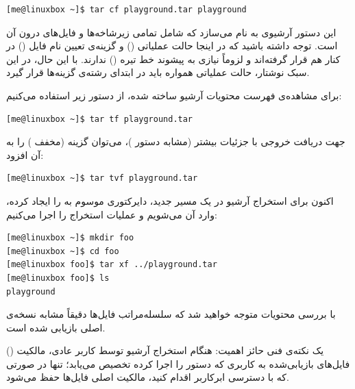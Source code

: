 \begin{latin}
\begin{lstlisting}
[me@linuxbox ~]$ tar cf playground.tar playground
\end{lstlisting}
\end{latin}

این دستور آرشیوی به نام  می‌سازد که شامل تمامی زیرشاخه‌ها و فایل‌های درون آن است. توجه داشته باشید که در اینجا حالت عملیاتی () و گزینه‌ی تعیین نام فایل () در کنار هم قرار گرفته‌اند و لزوماً نیازی به پیشوند خط تیره () ندارند. با این حال، در این سبک نوشتار، حالت عملیاتی همواره باید در ابتدای رشته‌ی گزینه‌ها قرار گیرد.

برای مشاهده‌ی فهرست محتویات آرشیو ساخته شده، از دستور زیر استفاده می‌کنیم:

\begin{latin}
\begin{lstlisting}
[me@linuxbox ~]$ tar tf playground.tar
\end{lstlisting}
\end{latin}

جهت دریافت خروجی با جزئیات بیشتر (مشابه دستور )، می‌توان گزینه  (مخفف ) را به آن افزود:

\begin{latin}
\begin{lstlisting}
[me@linuxbox ~]$ tar tvf playground.tar
\end{lstlisting}
\end{latin}

اکنون برای استخراج آرشیو در یک مسیر جدید، دایرکتوری موسوم به  را ایجاد کرده، وارد آن می‌شویم و عملیات استخراج را اجرا می‌کنیم:

\begin{latin}
\begin{lstlisting}
[me@linuxbox ~]$ mkdir foo
[me@linuxbox ~]$ cd foo
[me@linuxbox foo]$ tar xf ../playground.tar
[me@linuxbox foo]$ ls
playground
\end{lstlisting}
\end{latin}

با بررسی محتویات  متوجه خواهید شد که سلسله‌مراتب فایل‌ها دقیقاً مشابه نسخه‌ی اصلی بازیابی شده است.

یک نکته‌ی فنی حائز اهمیت: هنگام استخراج آرشیو توسط کاربر عادی، مالکیت () فایل‌های بازیابی‌شده به کاربری که دستور را اجرا کرده تخصیص می‌یابد؛ تنها در صورتی که با دسترسی ابرکاربر اقدام کنید، مالکیت اصلی فایل‌ها حفظ می‌شود.

